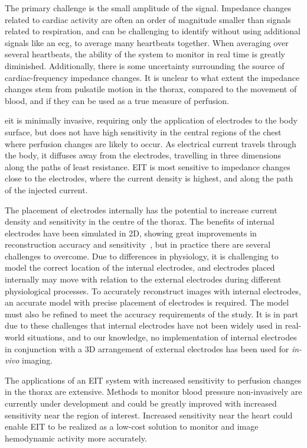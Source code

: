 The primary challenge is the small amplitude of the signal. 
Impedance changes related to cardiac activity are often an order of
magnitude smaller than signals related to respiration, 
and can be challenging to identify without using additional signals like 
an \acrfull{ecg}, to average many heartbeats together. When 
averaging over several heartbeats, the ability of the system to 
monitor in real time is greatly diminished. Additionally,
there is some uncertainty surrounding the source of
cardiac-frequency impedance changes. It is unclear to what 
extent the impedance changes stem from pulsatile
motion in the thorax, compared to the movement of blood, 
and if they can be used as a true measure of perfusion. 

\acrshort{eit} is minimally invasive, requiring only 
the application of electrodes to the body surface, but 
does not have high sensitivity in the central regions 
of the chest where perfusion changes are likely to occur.
As electrical current travels through the body, it diffuses away from 
the electrodes,
travelling in three dimensions along the paths of least resistance. 
EIT is most sensitive to impedance changes close to the electrodes,
where the current density is highest, 
and along the path of the injected current.

The placement of electrodes internally has the 
potential to increase current density and sensitivity in 
the centre of the thorax. 
The benefits of internal electrodes have been simulated 
in 2D, showing great improvements in reconstruction accuracy 
and sensitivity~\parencite{nasehi_tehrani_modelling_2012}, but 
in practice there are several challenges to overcome. 
Due to differences in physiology, it is challenging to model
the correct location of the internal electrodes,
and electrodes placed internally may move with relation 
to the external electrodes during different physiological
processes.  
To accurately reconstruct images with internal electrodes, 
an accurate model with precise placement of electrodes is required.
The model must also be refined 
to meet the accuracy requirements of the study.  
It is in part due to these challenges that internal electrodes 
have not been widely used in real-world situations, and to our knowledge,
no implementation of internal electrodes in conjunction 
with a 3D arrangement of external electrodes has been used for \emph{in-vivo}
imaging.

The applications of an EIT system with increased sensitivity to perfusion changes
in the thorax are extensive. Methods to monitor blood pressure non-invasively are 
currently under development and could be greatly improved with increased sensitivity 
near the region of interest. Increased sensitivity near the heart 
could enable EIT to be realized as a low-cost solution to monitor and image
hemodynamic activity more accurately.  

